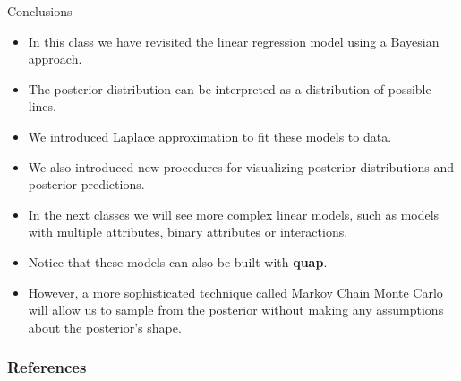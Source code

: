 \documentclass[handout]{beamer}
\begin{document}
\begin{frame}{Conclusions}
\scriptsize{

\begin{itemize}
\item In this class we have revisited the linear regression model using a Bayesian approach.

\item The posterior distribution can be interpreted as a distribution of possible lines.

\item We introduced Laplace approximation to fit these models to data.

\item We also introduced new procedures for visualizing posterior distributions and posterior predictions.

\item In the next classes we will see more complex linear models, such as models with multiple attributes, binary attributes or interactions.

\item Notice that these models can also be built with \textbf{quap}.

\item However, a more sophisticated technique called Markov Chain Monte Carlo will allow us to sample from the posterior without making any assumptions about the posterior's shape.


\end{itemize}


} 
\end{frame}


\begin{frame}[allowframebreaks]\scriptsize
\frametitle{References}


%
\end{frame}  









\end{document}
